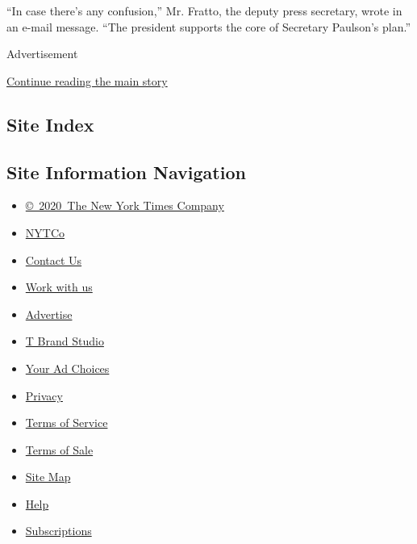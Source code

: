 ``In case there's any confusion,'' Mr. Fratto, the deputy press
secretary, wrote in an e-mail message. ``The president supports the core
of Secretary Paulson's plan.''

Advertisement

\protect\hyperlink{after-bottom}{Continue reading the main story}

\hypertarget{site-index}{%
\subsection{Site Index}\label{site-index}}

\hypertarget{site-information-navigation}{%
\subsection{Site Information
Navigation}\label{site-information-navigation}}

\begin{itemize}
\tightlist
\item
  \href{https://help.nytimes.com/hc/en-us/articles/115014792127-Copyright-notice}{©~2020~The
  New York Times Company}
\end{itemize}

\begin{itemize}
\tightlist
\item
  \href{https://www.nytco.com/}{NYTCo}
\item
  \href{https://help.nytimes.com/hc/en-us/articles/115015385887-Contact-Us}{Contact
  Us}
\item
  \href{https://www.nytco.com/careers/}{Work with us}
\item
  \href{https://nytmediakit.com/}{Advertise}
\item
  \href{http://www.tbrandstudio.com/}{T Brand Studio}
\item
  \href{https://www.nytimes.com/privacy/cookie-policy\#how-do-i-manage-trackers}{Your
  Ad Choices}
\item
  \href{https://www.nytimes.com/privacy}{Privacy}
\item
  \href{https://help.nytimes.com/hc/en-us/articles/115014893428-Terms-of-service}{Terms
  of Service}
\item
  \href{https://help.nytimes.com/hc/en-us/articles/115014893968-Terms-of-sale}{Terms
  of Sale}
\item
  \href{https://spiderbites.nytimes.com}{Site Map}
\item
  \href{https://help.nytimes.com/hc/en-us}{Help}
\item
  \href{https://www.nytimes.com/subscription?campaignId=37WXW}{Subscriptions}
\end{itemize}
